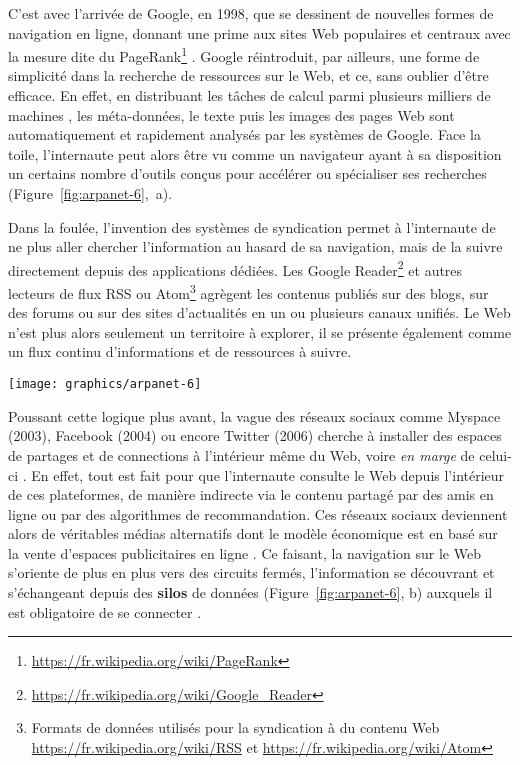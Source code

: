 \documentclass[symmetric,justified,marginals=raggedouter]{tufte-book}
\begin{document}
C'est avec l'arrivée de Google, en 1998, que se dessinent de nouvelles formes de navigation en ligne, donnant une prime aux sites Web populaires et centraux avec la mesure dite du PageRank\footnote{\RaggedOuter \url{https://fr.wikipedia.org/wiki/PageRank}} \citep{page_pagerank_1999}. Google réintroduit, par ailleurs, une forme de simplicité dans la recherche de ressources sur le Web, et ce, sans oublier d'être efficace. En effet, en distribuant les tâches de calcul parmi plusieurs milliers de machines \citep{brin_anatomy_1998}, les méta-données, le texte puis les images des pages Web sont automatiquement et rapidement analysés par les systèmes de Google.  Face la toile, l'internaute peut alors être vu comme un navigateur ayant à sa disposition un certains nombre d'outils conçus pour accélérer ou spécialiser ses recherches (Figure~\ref{fig:arpanet-6},~a).   

Dans la foulée, l'invention des systèmes de syndication permet à l'internaute de ne plus aller chercher l'information au hasard de sa navigation, mais de la suivre directement depuis des applications dédiées. Les Google Reader\footnote{\RaggedOuter \url{https://fr.wikipedia.org/wiki/Google\_Reader}} et autres lecteurs de flux RSS ou Atom\footnote{\RaggedOuter Formats de données utilisés pour la syndication à du contenu Web \url{https://fr.wikipedia.org/wiki/RSS} et \url{https://fr.wikipedia.org/wiki/Atom}} agrègent les contenus publiés sur des blogs, sur des forums ou sur des sites d'actualités en un ou plusieurs canaux unifiés. Le Web n'est plus alors seulement un territoire à explorer, il se présente également comme un flux continu d'informations et de ressources à suivre. 

\begin{figure*}
  \texttt{[image: graphics/arpanet-6]}
  \caption{Différents modes de consultation d'une information dans un réseau hypertexte (type Web)}
  \label{fig:arpanet-6}
\end{figure*} 

\noindent Poussant cette logique plus avant, la vague des réseaux sociaux comme Myspace (2003), Facebook (2004) ou encore Twitter (2006) cherche à installer des espaces de partages et de connections à l'intérieur même du Web, voire \textit{en marge} de celui-ci \citep{ellison_social_2007}. En effet, tout est fait pour que l'internaute consulte le Web depuis l'intérieur de ces plateformes, de manière indirecte via le contenu partagé par des amis en ligne ou par des algorithmes de recommandation. Ces réseaux sociaux deviennent alors de véritables médias alternatifs dont le modèle économique est en basé sur la vente d'espaces publicitaires en ligne \citep{loveluck_reseaux_2015}. Ce faisant, la navigation sur le Web s'oriente de plus en plus vers des circuits fermés, l'information se découvrant et s'échangeant depuis des \textbf{silos} de données (Figure~\ref{fig:arpanet-6}, b) auxquels il est obligatoire de se connecter \citep{helmond_platformization_2015}. 
\end{document}
